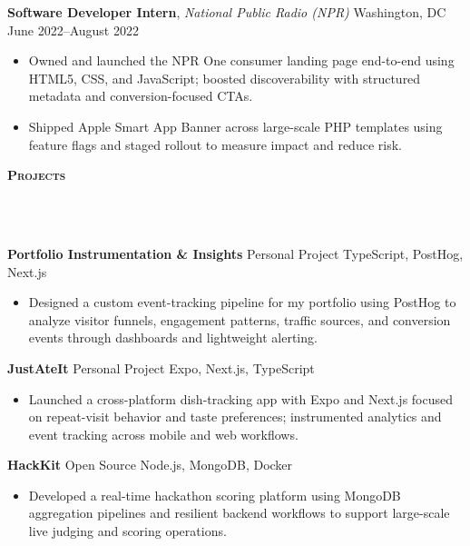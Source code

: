 \documentclass[10pt]{article}
\newcommand{\lineunder} {
    \vspace*{-10pt} \\
    \hspace*{-18pt} \hrulefill \\
    \vspace*{2pt}
}
\newcommand{\header} [1] {
  \vspace*{2pt}
    {\hspace*{-15pt}\textsc{#1}}
    \lineunder
}
\begin{document}
\textbf{Software Developer Intern}, \textit{National Public Radio (NPR)} \hfill Washington, DC \textbar{} June 2022--August 2022\\

\vspace{-2mm}
\begin{itemize}[leftmargin=5mm, itemsep=0mm]
  \item Owned and launched the NPR One consumer landing page end-to-end using HTML5, CSS, and JavaScript; boosted discoverability with structured metadata and conversion-focused CTAs.
  \item Shipped Apple Smart App Banner across large-scale PHP templates using feature flags and staged rollout to measure impact and reduce risk.
\end{itemize}

\header{\textbf{Projects}}

\textbf{Portfolio Instrumentation \& Insights} \hfill Personal Project \textbar{} TypeScript, PostHog, Next.js\\
\vspace{-2mm}
\begin{itemize}[leftmargin=5mm, itemsep=0mm]
  \item Designed a custom event-tracking pipeline for my portfolio using PostHog to analyze visitor funnels, engagement patterns, traffic sources, and conversion events through dashboards and lightweight alerting.
\end{itemize}

\textbf{JustAteIt} \hfill Personal Project \textbar{} Expo, Next.js, TypeScript\\
\vspace{-2mm}
\begin{itemize}[leftmargin=5mm, itemsep=0mm]
  \item Launched a cross-platform dish-tracking app with Expo and Next.js focused on repeat-visit behavior and taste preferences; instrumented analytics and event tracking across mobile and web workflows.
\end{itemize}

\textbf{HackKit} \hfill Open Source \textbar{} Node.js, MongoDB, Docker\\
\vspace{-2mm}
\begin{itemize}[leftmargin=5mm, itemsep=0mm]
  \item Developed a real-time hackathon scoring platform using MongoDB aggregation pipelines and resilient backend workflows to support large-scale live judging and scoring operations.
\end{itemize}
\end{document}
